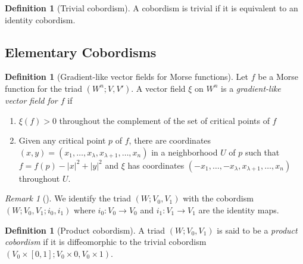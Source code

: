 \documentclass[reqno]{amsart}
\theoremstyle{definition}
\newtheorem{definition}[theorem]{Definition}
\theoremstyle{remark}
\newtheorem*{remark}{Remark}
\begin{document}
        \begin{definition}[Trivial cobordism]
            A cobordism is trivial if it is equivalent to
            an identity cobordism.
        \end{definition}


        \subsection{Elementary Cobordisms}

        \begin{definition}[Gradient-like vector fields for
            Morse functions]
            Let $f$ be a Morse function for the
            triad 
            $\left( W^{n}; V, V' \right) $. A vector field
            $\xi$ on $W^{n}$ is a \textit{gradient-like
            vector field for $f$} if
            \begin{enumerate}
                \item $\xi (f) >0$ throughout the complement
                    of the set of critical points of $f$
                \item Given any critical point $p$ of $f$,
                    there are coordinates
                    $\left( x,y \right) =
                    \left( x_1, \ldots, x_{\lambda},
                    x_{\lambda +1}, \ldots,
                x_n\right) $ in a neighborhood $U$ of $p$ 
                such that
                $f = f(p) - \left| x \right|^2 +
                \left| y \right|^2$ and
                $\xi$ has coordinates
                $\left( -x_1, \ldots, -x_{\lambda},
                x_{\lambda +1}, \ldots,
            x_n\right) $ throughout $U$.
            \end{enumerate}
        \end{definition}

        \begin{remark}[]
            We identify the triad
            $\left( W; V_0, V_1 \right) $ with the
            cobordism
            $\left( W; V_0, V_1 ; i_0, i_1 \right) $ where
            $i_0 \colon V_0 \to V_0 $ and
            $i_1 \colon V_1 \to V_1$ are the identity maps.
        \end{remark}

        \begin{definition}[Product cobordism]
            A triad $\left( W; V_0,V_1 \right)  $ is said
            to be a \textit{product cobordism} if it
            is diffeomorphic to the trivial cobordism
            $\left( V_0 \times \left[ 0,1 \right] ; V_0
            \times 0, V_0 \times 1\right) $.
        \end{definition}
\end{document}
